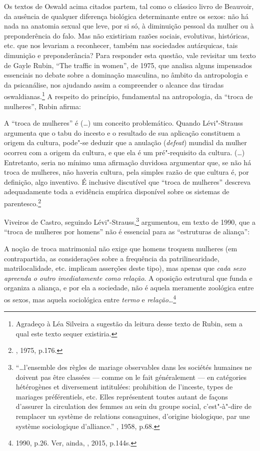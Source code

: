 Os textos de Oswald acima citados partem, tal como o clássico livro de
Beauvoir, da ausência de qualquer diferença biológica determinante entre
os sexos: não há nada na anatomia sexual que leve, por si só, à
diminuição pessoal da mulher ou à preponderência do falo. Mas não
existiriam razões sociais, evolutivas, históricas, etc. que nos levariam
a reconhecer, também nas sociedades autárquicas, tais dimunição e
preponderância? Para responder esta questão, vale revisitar um texto de
Gayle Rubin, ``The traffic in women'', de 1975, que analisa alguns
impensados essenciais no debate sobre a dominação masculina, no âmbito
da antropologia e da psicanálise, nos ajudando assim a compreender o
alcance das tiradas oswaldianas.\footnote{Agradeço à Léa Silveira a
  sugestão da leitura desse texto de Rubin, sem a qual este texto sequer
  existiria.} A respeito do princípio, fundamental na antropologia, da
``troca de mulheres'', Rubin afirma:

A ``troca de mulheres'' é (\ldots{}) um conceito problemático. Quando
Lévi"-Strauss argumenta que o tabu do incesto e o resultado de sua
aplicação constituem a origem da cultura, pode"-se deduzir que a anulação
(\emph{defeat}) mundial da mulher ocorreu com a origem da cultura, e que
ela é um pré"-requisito da cultura. (\ldots{}) Entretanto, seria no mínimo uma
afirmação duvidosa argumentar que, se não há troca de mulheres, não
haveria cultura, pela simples razão de que cultura é, por definição,
algo inventivo. É inclusive discutível que ``troca de mulheres''
descreva adequadamente toda a evidência empírica disponível sobre os
sistemas de parentesco.\footnote{, 1975, p.176.}

Viveiros de Castro, seguindo Lévi"-Strauss,\footnote{``\ldots{}l'ensemble des
  règles de mariage observables dans les sociétés humaines ne doivent
  pas être classées --- comme on le fait généralement --- en catégories
  hétérogènes et diversement intitulées: prohibition de l'inceste,
  types de mariages préférentiels, etc. Elles représentent toutes autant
  de façons d'assurer la circulation des femmes au sein du groupe
  social, c'est"-à"-dire de remplacer un système de relations consaguines,
  d'origine biologique, par une système sociologique d'alliance.''
  , 1958, p.68.} argumentou, em texto de 1990, que a ``troca
de mulheres por homens'' não é essencial para as ``estruturas de
aliança'':

A noção de troca matrimonial não exige que homens troquem mulheres (em
contrapartida, as considerações sobre a frequência da patrilinearidade,
matrilocalidade, etc. implicam asserções deste tipo), mas apenas que
\emph{cada sexo apreenda o outro imediatamente como relação}. A oposição
estrutural que funda e organiza a aliança, e por ela a sociedade, não é
aquela meramente zoológica entre os sexos, mas aquela sociológica entre
\emph{termo} e \emph{relação}\ldots{}\footnote{ 1990, p.26.
  Ver, ainda, , 2015, p.144s.}

